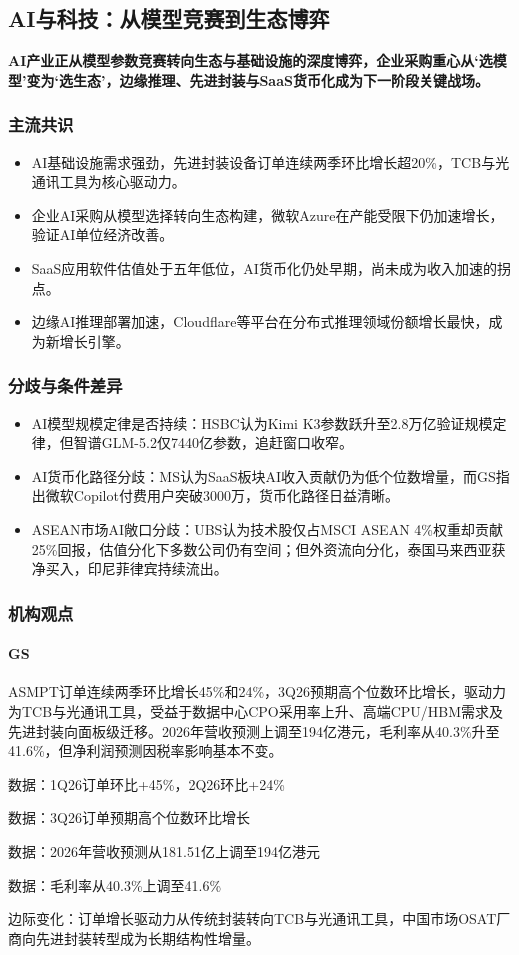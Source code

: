 \documentclass[11pt]{ctexart}
\begin{document}
\subsection{AI与科技：从模型竞赛到生态博弈}
\textbf{AI产业正从模型参数竞赛转向生态与基础设施的深度博弈，企业采购重心从‘选模型’变为‘选生态’，边缘推理、先进封装与SaaS货币化成为下一阶段关键战场。}
\subsubsection*{主流共识}
\begin{itemize}
  \item AI基础设施需求强劲，先进封装设备订单连续两季环比增长超20\%，TCB与光通讯工具为核心驱动力。
  \item 企业AI采购从模型选择转向生态构建，微软Azure在产能受限下仍加速增长，验证AI单位经济改善。
  \item SaaS应用软件估值处于五年低位，AI货币化仍处早期，尚未成为收入加速的拐点。
  \item 边缘AI推理部署加速，Cloudflare等平台在分布式推理领域份额增长最快，成为新增长引擎。
\end{itemize}
\subsubsection*{分歧与条件差异}
\begin{itemize}
  \item AI模型规模定律是否持续：HSBC认为Kimi K3参数跃升至2.8万亿验证规模定律，但智谱GLM-5.2仅7440亿参数，追赶窗口收窄。
  \item AI货币化路径分歧：MS认为SaaS板块AI收入贡献仍为低个位数增量，而GS指出微软Copilot付费用户突破3000万，货币化路径日益清晰。
  \item ASEAN市场AI敞口分歧：UBS认为技术股仅占MSCI ASEAN 4\%权重却贡献25\%回报，估值分化下多数公司仍有空间；但外资流向分化，泰国马来西亚获净买入，印尼菲律宾持续流出。
\end{itemize}
\subsubsection*{机构观点}
\paragraph{GS} ASMPT订单连续两季环比增长45\%和24\%，3Q26预期高个位数环比增长，驱动力为TCB与光通讯工具，受益于数据中心CPO采用率上升、高端CPU/HBM需求及先进封装向面板级迁移。2026年营收预测上调至194亿港元，毛利率从40.3\%升至41.6\%，但净利润预测因税率影响基本不变。
{\small\color{refgray}数据：1Q26订单环比+45\%，2Q26环比+24\%\par}
{\small\color{refgray}数据：3Q26订单预期高个位数环比增长\par}
{\small\color{refgray}数据：2026年营收预测从181.51亿上调至194亿港元\par}
{\small\color{refgray}数据：毛利率从40.3\%上调至41.6\%\par}
{\small\color{refgray}边际变化：订单增长驱动力从传统封装转向TCB与光通讯工具，中国市场OSAT厂商向先进封装转型成为长期结构性增量。\par}
\end{document}
